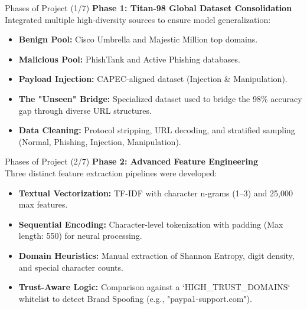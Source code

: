 \documentclass[aspectratio=169,xcolor=dvipsnames]{beamer}
\begin{document}
\begin{frame}{Phases of Project (1/7)}
\textbf{Phase 1: Titan-98 Global Dataset Consolidation} \\[0.2cm]
Integrated multiple high-diversity sources to ensure model generalization:
\begin{itemize}
    \item \textbf{Benign Pool:} Cisco Umbrella and Majestic Million top domains.
    \item \textbf{Malicious Pool:} PhishTank and Active Phishing databases.
    \item \textbf{Payload Injection:} CAPEC-aligned dataset (Injection \& Manipulation).
    \item \textbf{The "Unseen" Bridge:} Specialized dataset used to bridge the 98\% accuracy gap through diverse URL structures.
    \item \textbf{Data Cleaning:} Protocol stripping, URL decoding, and stratified sampling (Normal, Phishing, Injection, Manipulation).
\end{itemize}

\end{frame}

\begin{frame}{Phases of Project (2/7)}
\textbf{Phase 2: Advanced Feature Engineering} \\[0.2cm]
Three distinct feature extraction pipelines were developed:
\begin{itemize}
    \item \textbf{Textual Vectorization:} TF-IDF with character n-grams (1--3) and 25,000 max features.
    \item \textbf{Sequential Encoding:} Character-level tokenization with padding (Max length: 550) for neural processing.
    \item \textbf{Domain Heuristics:} Manual extraction of Shannon Entropy, digit density, and special character counts.
    \item \textbf{Trust-Aware Logic:} Comparison against a `HIGH\_TRUST\_DOMAINS` whitelist to detect Brand Spoofing (e.g., "paypa1-support.com").
\end{itemize}
\end{frame}
\end{document}
